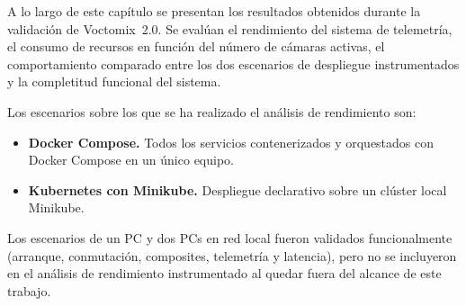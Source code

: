 A lo largo de este capítulo se presentan los resultados obtenidos durante la
validación de Voctomix~2.0. Se evalúan el rendimiento del sistema de telemetría,
el consumo de recursos en función del número de cámaras activas, el comportamiento
comparado entre los dos escenarios de despliegue instrumentados y la completitud
funcional del sistema.

Los escenarios sobre los que se ha realizado el análisis de rendimiento son:

\begin{itemize}
  \item \textbf{Docker Compose.} Todos los servicios contenerizados y orquestados
        con Docker Compose en un único equipo.
  \item \textbf{Kubernetes con Minikube.} Despliegue declarativo sobre un clúster
        local Minikube.
\end{itemize}

Los escenarios de un PC y dos PCs en red local fueron validados funcionalmente
(arranque, conmutación, composites, telemetría y latencia), pero no se incluyeron
en el análisis de rendimiento instrumentado al quedar fuera del alcance de este
trabajo.
